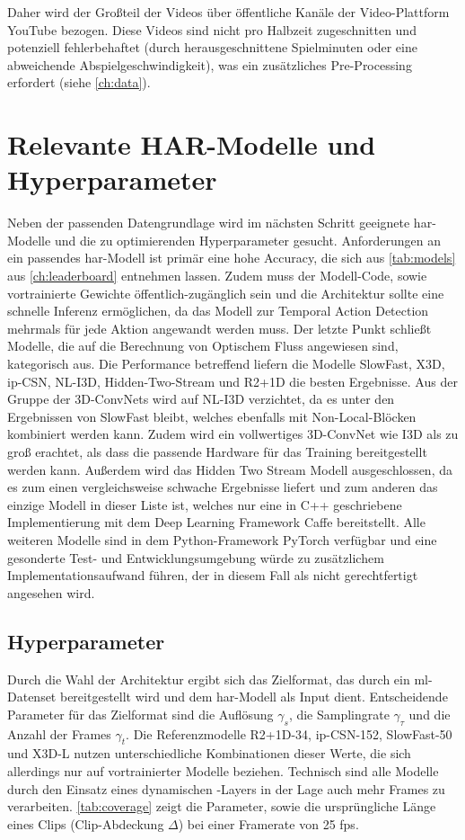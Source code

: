 Daher wird der Großteil der Videos über öffentliche Kanäle der Video-Plattform YouTube bezogen.
Diese Videos sind nicht pro Halbzeit zugeschnitten und potenziell fehlerbehaftet (\zB durch herausgeschnittene Spielminuten oder eine abweichende Abspielgeschwindigkeit), was ein zusätzliches Pre-Processing erfordert (siehe \autoref{ch:data}).

\section{Relevante HAR-Modelle und Hyperparameter}
\label{sec:decisions}

Neben der passenden Datengrundlage wird im nächsten Schritt geeignete \gls{har}-Modelle und die zu optimierenden Hyperparameter gesucht.
Anforderungen an ein passendes \gls{har}-Modell ist primär eine hohe Accuracy, die sich aus \autoref{tab:models} aus \autoref{ch:leaderboard} entnehmen lassen.
Zudem muss der Modell-Code, sowie vortrainierte Gewichte öffentlich-zugänglich sein und die Architektur sollte eine schnelle Inferenz ermöglichen, da das Modell zur Temporal Action Detection mehrmals für jede Aktion angewandt werden muss.
Der letzte Punkt schließt Modelle, die auf die Berechnung von Optischem Fluss angewiesen sind, kategorisch aus.
Die Performance betreffend liefern die Modelle SlowFast, X3D, ip-CSN, NL-I3D, Hidden-Two-Stream und R2+1D die besten Ergebnisse.
Aus der Gruppe der 3D-ConvNets wird auf NL-I3D verzichtet, da es unter den Ergebnissen von SlowFast bleibt, welches ebenfalls mit Non-Local-Blöcken kombiniert werden kann.
Zudem wird ein vollwertiges 3D-ConvNet wie I3D als zu groß erachtet, als dass die passende Hardware für das Training bereitgestellt werden kann.
Außerdem wird das Hidden Two Stream Modell ausgeschlossen, da es zum einen vergleichsweise schwache Ergebnisse liefert und zum anderen das einzige Modell in dieser Liste ist, welches nur eine in C++ geschriebene Implementierung mit dem Deep Learning Framework Caffe \cite{Jia14} bereitstellt.
Alle weiteren Modelle sind in dem Python-Framework PyTorch \cite{Paszke19} verfügbar und eine gesonderte Test- und Entwicklungsumgebung würde zu zusätzlichem Implementationsaufwand führen, der in diesem Fall als nicht gerechtfertigt angesehen wird.

\subsection{Hyperparameter}
\label{subsec:hyperparameter}

Durch die Wahl der Architektur ergibt sich das Zielformat, das durch ein \gls{ml}-Datenset bereitgestellt wird und dem \gls{har}-Modell als Input dient.
Entscheidende Parameter für das Zielformat sind die Auflösung $\gamma_s$, die Samplingrate $\gamma_\tau$ und die Anzahl der Frames $\gamma_t$.
Die Referenzmodelle R2+1D-34, ip-CSN-152, SlowFast-50 und X3D-L nutzen unterschiedliche Kombinationen dieser Werte, die sich allerdings nur auf vortrainierter Modelle beziehen.
Technisch sind alle Modelle durch den Einsatz eines dynamischen \pool-Layers in der Lage auch mehr Frames zu verarbeiten.
\autoref{tab:coverage} zeigt die Parameter, sowie die ursprüngliche Länge eines Clips (Clip-Abdeckung $\Delta$) bei einer Framerate von 25 \gls{fps}.

